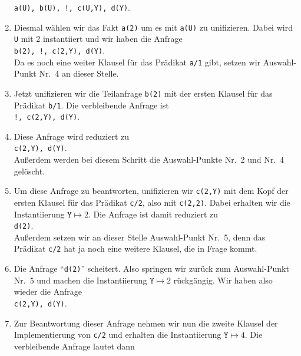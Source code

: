 \begin{enumerate}
      \hspace*{1.3cm} \texttt{a(U), b(U), !, c(U,Y), d(Y)}. 
\item Diesmal w\"{a}hlen wir das Fakt \texttt{a(2)} um es mit \texttt{a(U)} zu unifizieren.  Dabei wird \texttt{U} mit
      2 instantiiert und wir haben die  Anfrage \\[0.1cm]
      \hspace*{1.3cm} \texttt{b(2), !, c(2,Y), d(Y)}. \\[0.1cm]
      Da es noch eine weiter Klausel f\"{u}r das Pr\"{a}dikat \texttt{a/1} gibt, setzen wir 
      Auswahl-Punkt Nr.~4 an dieser Stelle.
\item Jetzt unifizieren wir  die Teilanfrage \texttt{b(2)} mit der ersten Klausel f\"{u}r das Pr\"{a}dikat
      \texttt{b/1}.  Die verbleibende Anfrage ist \\[0.1cm]
      \hspace*{1.3cm} \texttt{!, c(2,Y), d(Y)}. 
\item Diese Anfrage wird reduziert zu \\[0.1cm]
      \hspace*{1.3cm}  \texttt{c(2,Y), d(Y)}. \\[0.1cm]
      Außerdem werden bei diesem Schritt die Auswahl-Punkte Nr.~2 und Nr.~4 gel\"{o}scht.
\item Um diese Anfrage zu beantworten, unifizieren wir \texttt{c(2,Y)} mit dem Kopf der
      ersten Klausel f\"{u}r das Pr\"{a}dikat \texttt{c/2}, also mit \texttt{c(2,2)}.
      Dabei erhalten wir die Instantiierung
      $\mathtt{Y} \mapsto 2$.  Die Anfrage ist damit reduziert zu \\[0.1cm]
      \hspace*{1.3cm}  \texttt{d(2)}. \\[0.1cm]
      Außerdem setzen wir an dieser Stelle Auswahl-Punkt Nr.~5, denn das Pr\"{a}dikat
      \texttt{c/2} hat ja noch eine weitere Klausel, die in Frage kommt.
\item Die Anfrage ``\texttt{d(2)}'' scheitert.  Also springen wir zur\"{u}ck zum Auswahl-Punkt
      Nr.~5 und machen die Instantiierung $\mathtt{Y} \mapsto 2$ r\"{u}ckg\"{a}ngig.  Wir haben
      also wieder die Anfrage \\[0.1cm]
      \hspace*{1.3cm}  \texttt{c(2,Y), d(Y)}. 
\item Zur Beantwortung dieser Anfrage nehmen wir nun die zweite Klausel der
      Implementierung von \texttt{c/2} und erhalten die Instantiierung 
      $\mathtt{Y} \mapsto 4$.  Die verbleibende Anfrage lautet dann \\[0.1cm]

\end{enumerate}
